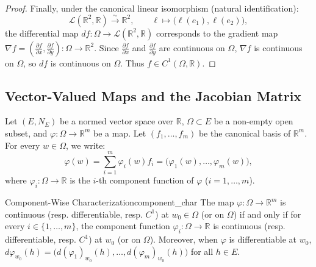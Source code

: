 \documentclass[11pt, a4paper]{article}
\newcommand{\R}{\mathbb{R}}
\begin{document}
\begin{proof}
Finally, under the canonical linear isomorphism (natural identification):
\[
\mathcal{L}(\R^2, \R) \xrightarrow{\sim} \R^2, \qquad \ell \longmapsto \big(\ell(e_1), \ell(e_2)\big),
\]
the differential map $df: \Omega \to \mathcal{L}(\R^2, \R)$ corresponds to the gradient map $\nabla f = \left(\frac{\partial f}{\partial x}, \frac{\partial f}{\partial y}\right): \Omega \to \R^2$. Since $\frac{\partial f}{\partial x}$ and $\frac{\partial f}{\partial y}$ are continuous on $\Omega$, $\nabla f$ is continuous on $\Omega$, so $df$ is continuous on $\Omega$. Thus $f \in C^1(\Omega, \R)$.
\end{proof}

\subsection{Vector-Valued Maps and the Jacobian Matrix}
Let $(E, N_E)$ be a normed vector space over $\R$, $\Omega \subset E$ be a non-empty open subset, and $\varphi: \Omega \to \R^m$ be a map. Let $(f_1, \dots, f_m)$ be the canonical basis of $\R^m$. For every $w \in \Omega$, we write:
\[
\varphi(w) = \sum_{i=1}^m \varphi_i(w) f_i = \big(\varphi_1(w), \dots, \varphi_m(w)\big),
\]
where $\varphi_i: \Omega \to \R$ is the $i$-th component function of $\varphi$ ($i = 1, \dots, m$).

\begin{proposition}{Component-Wise Characterization}{component_char}
The map $\varphi: \Omega \to \R^m$ is continuous (resp. differentiable, resp. $C^1$) at $w_0 \in \Omega$ (or on $\Omega$) if and only if for every $i \in \{1, \dots, m\}$, the component function $\varphi_i: \Omega \to \R$ is continuous (resp. differentiable, resp. $C^1$) at $w_0$ (or on $\Omega$). Moreover, when $\varphi$ is differentiable at $w_0$, $d\varphi_{w_0}(h) = \big(d(\varphi_1)_{w_0}(h), \dots, d(\varphi_m)_{w_0}(h)\big)$ for all $h \in E$.
\end{proposition}
\end{document}
